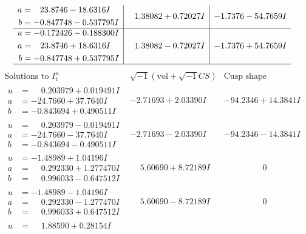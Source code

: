 \documentclass[1p]{elsarticle_modified}
\theoremstyle{definition}
\newcommand{\I}{\sqrt{-1}}
\begin{document}
$$\begin{array}{c|c|c}
\begin{aligned}
a &= \phantom{-}23.8746 - 18.6316 I \\
b &= -0.847748 - 0.537795 I\end{aligned}
 & \phantom{-}1.38082 + 0.72027 I & -1.7376 - 54.7659 I \\ \hline\begin{aligned}
u &= -0.172426 - 0.188300 I \\
a &= \phantom{-}23.8746 + 18.6316 I \\
b &= -0.847748 + 0.537795 I\end{aligned}
 & \phantom{-}1.38082 - 0.72027 I & -1.7376 + 54.7659 I\\
 \hline 
 \end{array}$$\newpage$$\begin{array}{c|c|c}  
\text{Solutions to }I^u_{1}& \I (\text{vol} + \sqrt{-1}CS) & \text{Cusp shape}\\
 \hline 
\begin{aligned}
u &= \phantom{-}0.203979 + 0.019491 I \\
a &= -24.7660 + 37.7640 I \\
b &= -0.843694 + 0.490511 I\end{aligned}
 & -2.71693 + 2.03390 I & -94.2346 + 14.3841 I \\ \hline\begin{aligned}
u &= \phantom{-}0.203979 - 0.019491 I \\
a &= -24.7660 - 37.7640 I \\
b &= -0.843694 - 0.490511 I\end{aligned}
 & -2.71693 - 2.03390 I & -94.2346 - 14.3841 I \\ \hline\begin{aligned}
u &= -1.48989 + 1.04196 I \\
a &= \phantom{-}0.292330 + 1.277470 I \\
b &= \phantom{-}0.996033 - 0.647512 I\end{aligned}
 & \phantom{-}5.60690 + 8.72189 I & \phantom{-0.000000 } 0 \\ \hline\begin{aligned}
u &= -1.48989 - 1.04196 I \\
a &= \phantom{-}0.292330 - 1.277470 I \\
b &= \phantom{-}0.996033 + 0.647512 I\end{aligned}
 & \phantom{-}5.60690 - 8.72189 I & \phantom{-0.000000 } 0 \\ \hline\begin{aligned}
u &= \phantom{-}1.88590 + 0.28154 I \\

\end{aligned}
\end{array}$$
\end{document}
